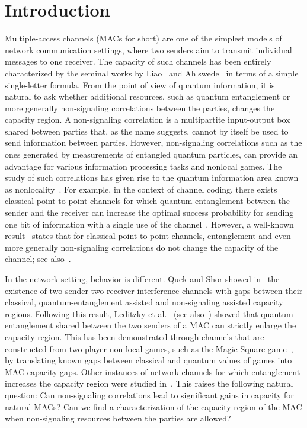 \documentclass[11pt]{article}
\theoremstyle{definition}
\theoremstyle{remark}
\begin{document}
\section{Introduction}
Multiple-access channels (MACs for short) are one of the simplest models of network communication settings, where two senders aim to transmit individual messages to one receiver. The capacity of such channels has been entirely characterized by the seminal works by Liao~\cite{Liao73} and Ahlswede~\cite{Ahlswede73} in terms of a simple single-letter formula. From the point of view of quantum information, it is natural to ask whether additional resources, such as quantum entanglement or more generally non-signaling correlations between the parties, changes the capacity region. A non-signaling correlation is a multipartite input-output box shared between parties that, as the name suggests, cannot by itself be used to send information between parties. However, non-signaling correlations such as the ones generated by measurements of entangled quantum particles, can provide an advantage for various information processing tasks and nonlocal games. The study of such correlations has given rise to the quantum information area known as nonlocality~\cite{BCPSW14}. For example, in the context of channel coding, there exists classical point-to-point channels for which quantum entanglement between the sender and the receiver can increase the optimal success probability for sending one bit of information with a single use of the channel~\cite{PLMK11,BF18}. However, a well-known result~\cite{BSST99} states that for classical point-to-point channels, entanglement and even more generally non-signaling correlations do not change the capacity of the channel; see also~\cite{Matthews12,BF18}.

In the network setting, behavior is different. Quek and Shor showed in~\cite{QS17} the existence of two-sender two-receiver interference channels with gaps between their classical, quantum-entanglement assisted and non-signaling assisted capacity regions. Following this result, Leditzky et al.~\cite{LALS20} (see also~\cite{SLSS22}) showed that quantum entanglement shared between the two senders of a MAC can strictly enlarge the capacity region. This has been demonstrated through channels that are constructed from two-player non-local games, such as the Magic Square game~\cite{Mermin90,Peres90,Aravind02,BBT05}, by translating known gaps between classical and quantum values of games into MAC capacity gaps. Other instances of network channels for which entanglement increases the capacity region were studied in~\cite{Noetzel20,ND20}. This raises the following natural question: Can non-signaling correlations lead to significant gains in capacity for natural MACs? Can we find a characterization of the capacity region of the MAC when non-signaling resources between the parties are allowed? 
\end{document}
